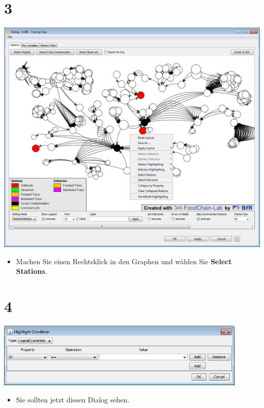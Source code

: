 \documentclass{beamer}
\begin{document}
\section{3}
\begin{frame}
	\begin{center}
  		\includegraphics[height=0.6\textheight]{3.png}
	\end{center}
	\begin{itemize}
		\item Machen Sie einen Rechtsklick in den Graphen und wählen Sie \textbf{Select Stations}.
	\end{itemize}
\end{frame}

\section{4}
\begin{frame}
	\begin{center}
  		\includegraphics[width=0.9\textwidth]{4.png}
	\end{center}
	\begin{itemize}
		\item Sie sollten jetzt diesen Dialog sehen.
	\end{itemize}
\end{frame}
\end{document}
